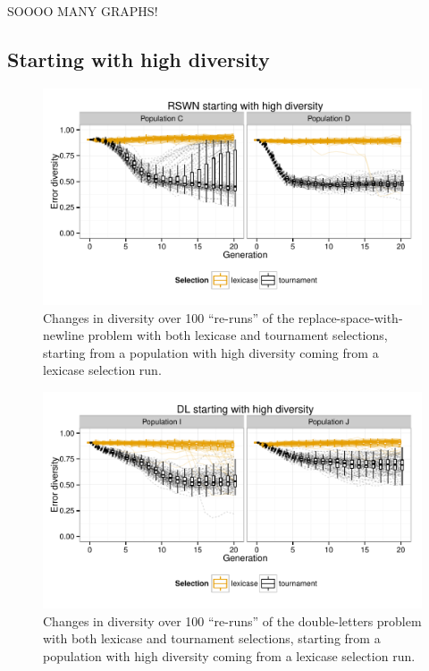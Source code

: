 \documentclass{sig-alternate-05-2015}
\begin{document}
SOOOO MANY GRAPHS!

\subsection{Starting with high diversity}
\label{sec:highDiversityResults}

\begin{figure}
	\includegraphics{../figures/RSWN_high_diversity}
	\vspace{-1 cm}
	\caption{Changes in diversity over 100 ``re-runs'' of the replace-space-with-newline problem with both lexicase and tournament selections, starting from a population with high diversity coming from a lexicase selection run.}
	\label{fig:RSWNhighDiversity}
\end{figure}

\begin{figure}
	\includegraphics{../figures/DL_high_diversity}
	\vspace{-1 cm}
	\caption{Changes in diversity over 100 ``re-runs'' of the double-letters problem with both lexicase and tournament selections, starting from a population with high diversity coming from a lexicase selection run.}
	\label{fig:DLhighDiversity}
\end{figure}
\end{document}
